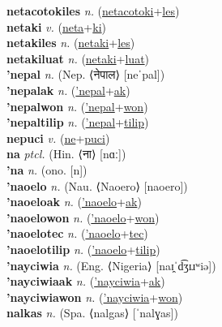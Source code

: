 \textbf{netacotokiles} \textit{n.} (\hyperref[netacotoki]{netacotoki}+\hyperref[les]{les})
 \label{netacotokiles} \\
\textbf{netaki} \textit{v.} (\hyperref[neta]{neta}+\hyperref[ki]{ki})
 \label{netaki} \\
\textbf{netakiles} \textit{n.} (\hyperref[netaki]{netaki}+\hyperref[les]{les})
 \label{netakiles} \\
\textbf{netakiluat} \textit{n.} (\hyperref[netaki]{netaki}+\hyperref[luat]{luat})
 \label{netakiluat} \\
\textbf{'nepal} \textit{n.} (Nep. ⟨नेपाल⟩ [neˈpal])
 \label{'nepal} \\
\textbf{'nepalak} \textit{n.} (\hyperref['nepal]{'nepal}+\hyperref[ak]{ak})
 \label{'nepalak} \\
\textbf{'nepalwon} \textit{n.} (\hyperref['nepal]{'nepal}+\hyperref[won]{won})
 \label{'nepalwon} \\
\textbf{'nepaltilip} \textit{n.} (\hyperref['nepal]{'nepal}+\hyperref[tilip]{tilip})
 \label{'nepaltilip} \\
\textbf{nepuci} \textit{v.} (\hyperref[ne]{ne}+\hyperref[puci]{puci})
 \label{nepuci} \\
\textbf{na} \textit{ptcl.} (Hin. ⟨ना⟩ [nɑː])
 \label{na} \\
\textbf{'na} \textit{n.} (ono. [n])
 \label{'na} \\
\textbf{'naoelo} \textit{n.} (Nau. ⟨Naoero⟩ [naoero])
 \label{'naoelo} \\
\textbf{'naoeloak} \textit{n.} (\hyperref['naoelo]{'naoelo}+\hyperref[ak]{ak})
 \label{'naoeloak} \\
\textbf{'naoelowon} \textit{n.} (\hyperref['naoelo]{'naoelo}+\hyperref[won]{won})
 \label{'naoelowon} \\
\textbf{'naoelotec} \textit{n.} (\hyperref['naoelo]{'naoelo}+\hyperref[tec]{tec})
 \label{'naoelotec} \\
\textbf{'naoelotilip} \textit{n.} (\hyperref['naoelo]{'naoelo}+\hyperref[tilip]{tilip})
 \label{'naoelotilip} \\
\textbf{'nayciwia} \textit{n.} (Eng. ⟨Nigeria⟩ [naɪ̯ˈd͡ʒɪɹʷiə])
 \label{'nayciwia} \\
\textbf{'nayciwiaak} \textit{n.} (\hyperref['nayciwia]{'nayciwia}+\hyperref[ak]{ak})
 \label{'nayciwiaak} \\
\textbf{'nayciwiawon} \textit{n.} (\hyperref['nayciwia]{'nayciwia}+\hyperref[won]{won})
 \label{'nayciwiawon} \\
\textbf{nalkas} \textit{n.} (Spa. ⟨nalgas⟩ [ˈnalɣas])
